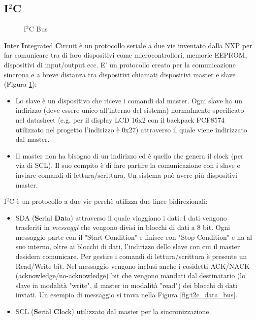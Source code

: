 \documentclass[12pt]{report}
\begin{document}
%
\subsection{I$^2$C}\label{sec:i2c}
%

\begin{figure}
	\caption{I$^2$C Bus}
	\label{fig:i2c_bus}
\end{figure}

\textbf{I}nter \textbf{I}ntegrated \textbf{C}ircuit è un protocollo seriale a due vie inventato dalla NXP per far comunicare tra di loro dispositivi come microcontrollori, memorie EEPROM, dispositivi di input/output ecc. E' un protocollo creato per la comunicazione sincrona e a breve distanza tra dispositivi chiamati dispositivi master e slave (Figura \ref{fig:i2c_bus}): 

\begin{itemize}
	\item Lo slave è un dispositivo che riceve i comandi dal master. Ogni slave ha un indirizzo (deve essere unico all'interno del sistema) normalmente specificato nel datasheet (e.g$.$ per il display LCD 16x2 con il backpack PCF8574 utilizzato nel progetto l'indirizzo è 0x27) attraverso il quale viene indirizzato dal master.
	\item Il master non ha bisogno di un indirizzo ed è quello che genera il clock (per via di SCL). Il suo compito è di fare partire la comunicazione con i slave e inviare comandi di lettura/scrittura. Un sistema può avere più dispositivi master.
\end{itemize}
I$^2$C è un protocollo a due vie perchè utilizza due linee bidirezionali:

\begin{itemize}
	\item SDA (\textbf{S}erial \textbf{Da}ta) attraverso il quale viaggiano i dati. I dati vengono trasferiti in \textit{messaggi} che vengono divisi in blocchi di dati a 8 bit. Ogni messaggio parte con il "Start Condition" e finisce con "Stop Condition" e ha al suo interno, oltre ai blocchi di dati, l'indirizzo dello slave con cui il master desidera comunicare. Per gestire i comandi di lettura/scrittura è presente un Read/Write bit. Nel messaggio vengono inclusi anche i cosidetti ACK/NACK (acknowledge/no-acknowledge) bit che vengono mandati dal destinatario (lo slave in modalità "write", il master in modalità "read") dei blocchi di dati inviati. Un esempio di messaggio si trova nella Figura \ref{fig:i2c_data_bus}. 
	\item SCL (\textbf{S}erial \textbf{Cl}ock) utilizzato dal master per la sincronizzazione.
\end{itemize}
\end{document}

